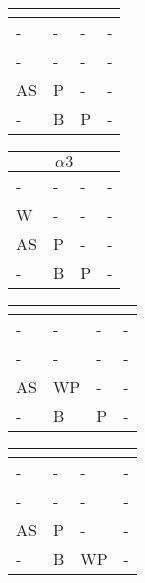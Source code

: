 \documentclass{math}
\begin{document}
\begin{center}
  \begin{tabular}{|p{0.6cm}|p{0.6cm}|p{0.6cm}|p{0.6cm}|}
    \hline
    \multicolumn{4}{|c|}{} \\ \hline
    - & - & - & - \\ \hline
    - & - & - & - \\ \hline
    AS & P & - & - \\ \hline
    - & B & P & - \\ \hline
  \end{tabular}
  \begin{tabular}{|p{0.6cm}|p{0.6cm}|p{0.6cm}|p{0.6cm}|}
    \hline
    \multicolumn{4}{|c|}{\( \alpha3 \)} \\ \hline
    - & - & - & - \\ \hline
    W & - & - & - \\ \hline
    AS & P & - & - \\ \hline
    - & B & P & - \\ \hline
  \end{tabular}
  \begin{tabular}{|p{0.6cm}|p{0.6cm}|p{0.6cm}|p{0.6cm}|}
    \hline
    \multicolumn{4}{|c|}{} \\ \hline
    - & - & - & - \\ \hline
    - & - & - & - \\ \hline
    AS & WP & - & - \\ \hline
    - & B & P & - \\ \hline
  \end{tabular}
  \begin{tabular}{|p{0.6cm}|p{0.6cm}|p{0.6cm}|p{0.6cm}|}
    \hline
    \multicolumn{4}{|c|}{} \\ \hline
    - & - & - & - \\ \hline
    - & - & - & - \\ \hline
    AS & P & - & - \\ \hline
    - & B & WP & - \\ \hline
  \end{tabular} \\[0.5cm]


\end{center}
\end{document}
